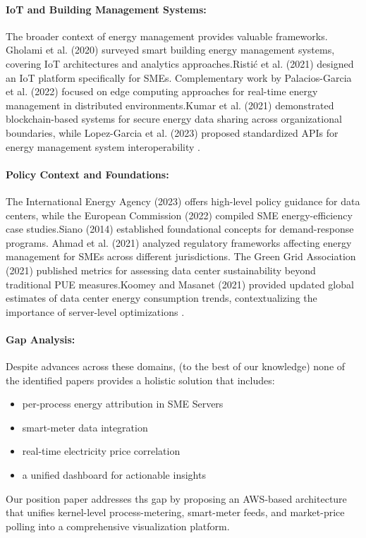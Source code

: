 \paragraph{\textbf{IoT and Building Management Systems:}}
The broader context of energy management provides valuable frameworks.
Gholami et al. (2020) surveyed smart building energy management systems, covering IoT architectures
and analytics approaches.Ristić et al. (2021) designed an IoT platform specifically for SMEs.
Complementary work by Palacios-Garcia et al. (2022) focused on edge computing approaches for
real-time energy management in distributed environments.Kumar et al. (2021) demonstrated
blockchain-based systems for secure energy data sharing across organizational boundaries,
while Lopez-Garcia et al. (2023) proposed standardized APIs for energy management system
interoperability \cite{gholami2020energymanagement,ristic2021iotenergymanagement,palacios2022edge,lopez2023standardized}.

\paragraph{\textbf{Policy Context and Foundations:}}
The International Energy Agency (2023) offers high-level policy guidance for data centers, while
the European Commission (2022) compiled SME energy-efficiency case studies.Siano (2014) established
foundational concepts for demand-response programs. Ahmad et al. (2021) analyzed regulatory
frameworks affecting energy management for SMEs across different jurisdictions. The Green Grid
Association (2021) published metrics for assessing data center sustainability beyond traditional
PUE measures.Koomey and Masanet (2021) provided updated global estimates of data center energy
consumption trends, contextualizing the importance of server-level optimizations \cite{iea2023datacenters,ec2022energyefficiencysmes,siano2014demandresponse,ahmad2021regulatory,greengrid2021beyond,koomey2021does}.


\paragraph{\textbf{Gap Analysis:}}
Despite advances across these domains, (to the best of our knowledge) none of the identified papers provides a holistic solution that includes:

\begin{itemize}
	\item per-process energy attribution in SME Servers
	\item smart-meter data integration
	\item real-time electricity price correlation
	\item a unified dashboard for actionable insights
\end{itemize}

Our position paper addresses ths gap by proposing an AWS-based architecture that unifies
kernel-level process-metering, smart-meter feeds, and market-price polling into a comprehensive
visualization platform.